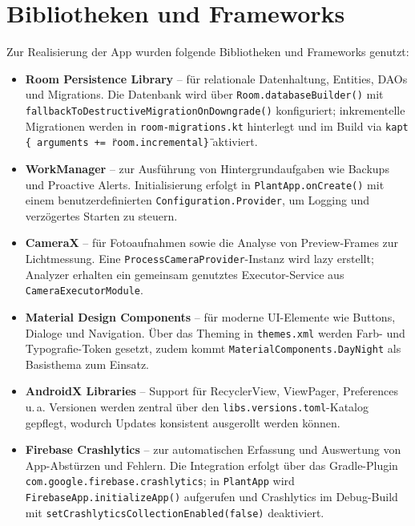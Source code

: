 \documentclass[14pt,a4paper]{report}
\begin{document}
\section{Bibliotheken und Frameworks}
Zur Realisierung der App wurden folgende Bibliotheken und Frameworks genutzt:
\begin{itemize}
    \item \textbf{Room Persistence Library} – für relationale Datenhaltung, Entities, DAOs und Migrations. Die Datenbank wird über \texttt{Room.databaseBuilder()} mit \texttt{fallbackToDestructiveMigrationOnDowngrade()} konfiguriert; inkrementelle Migrationen werden in \texttt{room-migrations.kt} hinterlegt und im Build via \texttt{kapt \{ arguments += \"room.incremental\" \}} aktiviert.
    \item \textbf{WorkManager} – zur Ausführung von Hintergrundaufgaben wie Backups und Proactive Alerts. Initialisierung erfolgt in \texttt{PlantApp.onCreate()} mit einem benutzerdefinierten \texttt{Configuration.Provider}, um Logging und verzögertes Starten zu steuern.
    \item \textbf{CameraX} – für Fotoaufnahmen sowie die Analyse von Preview-Frames zur Lichtmessung. Eine \texttt{ProcessCameraProvider}-Instanz wird lazy erstellt; Analyzer erhalten ein gemeinsam genutztes Executor-Service aus \texttt{CameraExecutorModule}.
    \item \textbf{Material Design Components} – für moderne UI-Elemente wie Buttons, Dialoge und Navigation. Über das Theming in \texttt{themes.xml} werden Farb- und Typografie-Token gesetzt, zudem kommt \texttt{MaterialComponents.DayNight} als Basisthema zum Einsatz.
    \item \textbf{AndroidX Libraries} – Support für RecyclerView, ViewPager, Preferences u.\,a. Versionen werden zentral über den \texttt{libs.versions.toml}-Katalog gepflegt, wodurch Updates konsistent ausgerollt werden können.
    \item \textbf{Firebase Crashlytics} – zur automatischen Erfassung und Auswertung von App-Abstürzen und Fehlern. Die Integration erfolgt über das Gradle-Plugin \texttt{com.google.firebase.crashlytics}; in \texttt{PlantApp} wird \texttt{FirebaseApp.initializeApp()} aufgerufen und Crashlytics im Debug-Build mit \texttt{setCrashlyticsCollectionEnabled(false)} deaktiviert.
\end{itemize}
\end{document}
